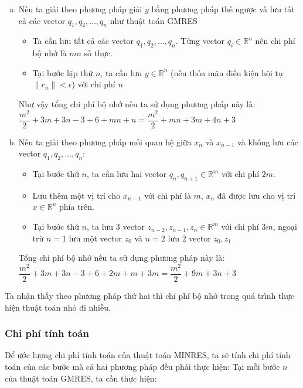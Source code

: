 \documentclass[14pt, a4paper]{article}
\numberwithin{equation}{section}
\numberwithin{algorithm}{section}
\numberwithin{figure}{section}
\numberwithin{dl}{section}
\numberwithin{md}{section}
\numberwithin{bd}{section}
\numberwithin{dn}{section}
\begin{document}
\begin{enumerate}[a)] %
    \item Nếu ta giải theo phương pháp giải $y$ bằng phương pháp thế ngược và lưu tất cả các vector $q_1, q_2, \dots, q_n$ như thuật toán GMRES
    \begin{itemize}
        \item Ta cần lưu tất cả các vector $q_1, q_2, \dots, q_n$. Từng vector $q_i \in \mathbb{R}^n$ nên chi phí bộ nhớ là $mn$ số thực.
        \item Tại bước lặp thứ $n$, ta cần lưu $y \in \mathbb{R}^n$ (nếu thỏa mãn điều kiện hội tụ $\lVert r_n \rVert < \epsilon$) với chi phí $n$
    \end{itemize}
    Như vậy tổng chi phí bộ nhớ nếu ta sử dụng phương pháp này là: $\dfrac{m^2}{2}+3m + 3n-3+6+mn+n=\dfrac{m^2}{2}+mn+3m+4n+3$
    \item Nếu ta giải theo phương pháp mối quan hệ giữa $x_n$ và $x_{n-1}$ và không lưu các vector $q_1, q_2, \dots, q_n$:
    \begin{itemize}
        \item Tại bước thứ $n$, ta cần lưu hai vector $q_{n}, q_{n+1} \in \mathbb{R}^m$ với chi phí $2m$.
        \item Lưu thêm một vị trí cho $x_{n-1}$ với chi phí là $m$, $x_n$ đã được lưu cho vị trí $x \in \mathbb{R}^n$ phía trên.
        \item Tại bước thứ $n$, ta lưu 3 vector $z_{n-2}, z_{n-1}, z_n \in \mathbb{R}^m$ với chi phí $3m$, ngoại trừ $n=1$ lưu một vector $z_0$ và $n=2$ lưu 2 vector $z_0, z_1$
    \end{itemize}
    Tổng chi phí bộ nhớ nếu ta sử dụng phương pháp này là: $\dfrac{m^2}{2}+3m + 3n-3+6+2m + m + 3m=\dfrac{m^2}{2}+9m+3n+3$
\end{enumerate}

Ta nhận thấy theo phương pháp thứ hai thì chi phí bộ nhớ trong quá trình thực hiện thuật toán nhỏ đi nhiều.

\subsubsection{Chi phí tính toán}

Để ước lượng chi phí tính toán của thuật toán MINRES, ta sẽ tính chi phí tính toán của các bước mà cả hai phương pháp đều phải thực hiện:
Tại mỗi bước $n$ của thuật toán GMRES, ta cần thực hiện:
\end{document}
